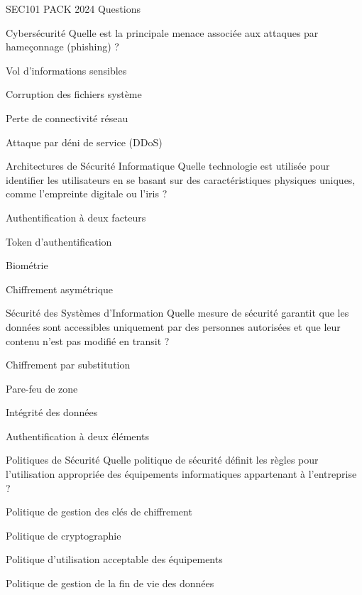 \documentclass[12pt]{article}
\begin{document}
\begin{quiz}{SEC101 PACK 2024 Questions}
  \begin{multi}[points=1]{Cybersécurité}
    Quelle est la principale menace associée aux attaques par hameçonnage (phishing) ?
    \item* Vol d'informations sensibles
    \item Corruption des fichiers système
    \item Perte de connectivité réseau
    \item Attaque par déni de service (DDoS)
  \end{multi}

  \begin{multi}[points=1]{Architectures de Sécurité Informatique}
    Quelle technologie est utilisée pour identifier les utilisateurs en se basant sur des caractéristiques physiques uniques, comme l'empreinte digitale ou l'iris  ?
    \item Authentification à deux facteurs
    \item Token d'authentification
    \item* Biométrie
    \item Chiffrement asymétrique
  \end{multi}

  \begin{multi}[points=1]{Sécurité des Systèmes d'Information}
    Quelle mesure de sécurité garantit que les données sont accessibles uniquement par des personnes autorisées et que leur contenu n'est pas modifié en transit ?
    \item Chiffrement par substitution
    \item Pare-feu de zone
    \item* Intégrité des données
    \item Authentification à deux éléments
  \end{multi}

  \begin{multi}[points=1]{Politiques de Sécurité}
    Quelle politique de sécurité définit les règles pour l'utilisation appropriée des équipements informatiques appartenant à l'entreprise ?
    \item Politique de gestion des clés de chiffrement
    \item Politique de cryptographie
    \item* Politique d'utilisation acceptable des équipements
    \item Politique de gestion de la fin de vie des données
  \end{multi}


\end{quiz}
\end{document}
